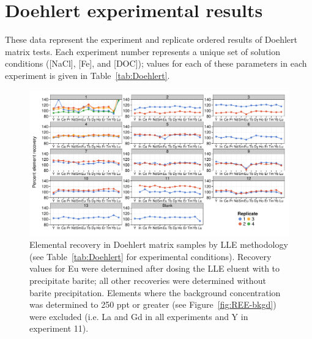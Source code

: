 \clearpage

\section{Doehlert experimental results}

These data represent the experiment and replicate ordered results of Doehlert matrix tests.
Each experiment number represents a unique set of solution conditions ([NaCl], [Fe], and [DOC]);
values for each of these parameters in each experiment is given in Table~\ref{tab:Doehlert}.

\begin{figure}
\begin{center}
\includegraphics[width=\textwidth]{Ch4_figures/Exp-wise-LLE-recovery.pdf}
\caption{Elemental recovery in Doehlert matrix samples by LLE methodology (see Table~\ref{tab:Doehlert} for experimental conditions).
Recovery values for Eu were determined after dosing the LLE eluent with  to precipitate barite;
all other recoveries were determined without barite precipitation.
Elements where the background concentration was determined to 250 ppt or greater (see Figure~\ref{fig:REE-bkgd}) were excluded (i.e. La and Gd in all experiments and Y in experiment 11).}
\label{fig:Doehlert-all}
\end{center}
\end{figure}

